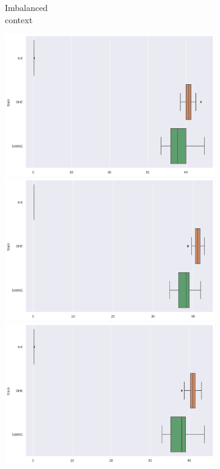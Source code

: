 \documentclass{article}
\theoremstyle{definition}
\begin{document}
\begin{figure}[ht]
\begin{subfigure}[b]{0.15\textwidth}
         \caption{Imbalanced \\ context}
         \label{Prediction_Imb_X_Lat}
     \end{subfigure}
     \begin{subfigure}[b]{0.15\textwidth}
         \centering
         \includegraphics[width=\textwidth]{imgs/Illu/1000Epochs/Bal/Boxplots_predTest_Lat.png}
         \quad
         \includegraphics[width=\textwidth]{imgs/Illu/2000Epochs/Bal/Boxplots_predTest_Lat.png}
         \quad
         \includegraphics[width=\textwidth]{imgs/Illu/3000Epochs/Bal/Boxplots_predTest_Lat.png}   

\end{subfigure}
\end{figure}
\end{document}
